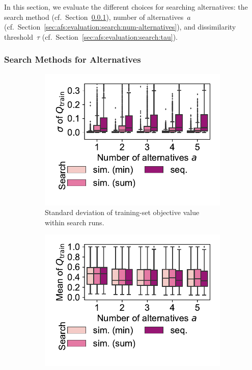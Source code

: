 \documentclass{article}
\theoremstyle{definition}
\begin{document}
In this section, we evaluate the different choices for searching alternatives: the search method (cf.~Section~\ref{sec:afs:evaluation:search:method}), number of alternatives~$a$ (cf.~Section~\ref{sec:afs:evaluation:search:num-alternatives}), and dissimilarity threshold~$\tau$ (cf.~Section~\ref{sec:afs:evaluation:search:tau}).

\subsubsection{Search Methods for Alternatives}
\label{sec:afs:evaluation:search:method}

\begin{figure}[p]
	\centering
	\begin{subfigure}[t]{0.48\textwidth}
		\centering
		\includegraphics[width=\textwidth, trim=15 25 15 10, clip]{plots/afs-impact-search-stddev-train-objective.pdf}
		\caption{Standard deviation of training-set objective value within search runs.}
		\label{fig:afs:impact-search-stddev-train-objective}
	\end{subfigure}
	\hfill
	\begin{subfigure}[t]{0.48\textwidth}
		\centering
		\includegraphics[width=\textwidth, trim=15 25 15 10, clip]{plots/afs-impact-search-mean-train-objective.pdf}

\end{subfigure}
\end{figure}
\end{document}
